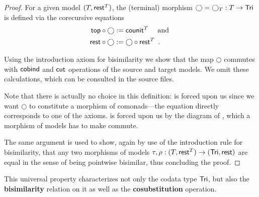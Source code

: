 \documentclass[a4paper,USenglish]{lipics}
\newcommand{\fat}[1]{\textbf{#1}}
\begin{document}
\begin{Long}
\begin{proof}
   For a given model $(T,\mathsf{rest}^T)$, the (terminal) morphism $\bigcirc = \bigcirc_T:T\to\mathsf{Tri}$ is defined via the corecursive equations
%       
    \begin{align}  {\ensuremath{\mathsf{top}}} \circ {\bigcirc} &:= \mathsf{counit}^T \quad \text{ and } \label{eq:terminal_top}\\
                   {\mathsf{rest}} \circ {\bigcirc} &:= {\bigcirc} \circ {\ensuremath{\mathsf{rest}}^T} \enspace . \label{eq:terminal_rest}
    \end{align}

      Using the introduction axiom for bisimilarity we show that the map $\bigcirc$ commutes with $\mathsf{cobind}$ and $\mathsf{cut}$ operations of the source and 
   target models. We omit these calculations, which can be consulted in the \coq source files.
   
   Note that there is actually no choice in this definition:  is forced upon us since we want $\bigcirc$ to constitute 
   a morphism of comonads---the equation directly corresponds to one of the axioms.
    is forced upon us by the diagram of , which a morphism of models has to make commute.
   
   The same argument is used to show, again by use of the introduction rule for bisimilarity, that any two morphisms of models $\tau,\rho : (T,\mathsf{rest}^T) \to (\mathsf{Tri},\mathsf{rest})$
   are equal in the sense of being pointwise bisimilar, thus concluding the proof.   
\end{proof}
\end{Long}

This universal property characterizes not only the codata type $\mathsf{Tri}$, but also
the \fat{bisimilarity} relation on it as well as the \fat{cosubstitution} operation.
\end{document}

